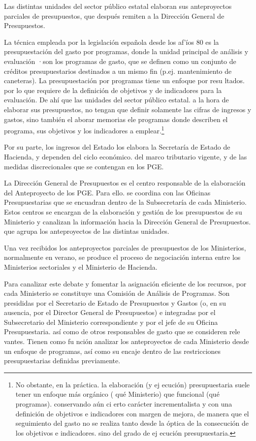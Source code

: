 \documentclass[10pt,a4paper]{article}
\begin{document}
Las distintas unidades del sector público estatal elaboran sus anteproyectos parciales de presupuestos, que después remiten a la Dirección General de Presupuestos.

La técnica empleada por la legislación española desde los af'íos 80 es la presupuestación del gasto por programas, donde la unidad principal de análisis y evaluación ·son los programas de gasto, que se definen como un conjunto de créditos presupuestarios destinados a un mismo fin (p.ej.  mantenimiento de caneteras). La presupuestación por programas tiene un enfoque por resu ltados. por lo que requiere de la definición de objetivos y de indicadores para la evaluación. De ahí que las unidades del sector público estatal. a la hora de elaborar sus presupuestos, no tengan que definir solamente las cifras de ingresos y gastos, sino también el aborar memorias ele programas donde describen el programa, sus objetivos y los indicadores a emplear.\footnote{%
    No obstante, en la práctica. la elaboración (y ej ecución) presupuestaria suele tener un enfoque más orgánico ( qué Ministerio) que funcional (qué programas). conservando aún ci erto carácter incrementalista y con una definición de objetivos e indicadores con margen de mejora, de manera que el seguimiento del gasto no se realiza tanto desde la óptica de la consecución de los objetivos e indicadores. sino del grado de ej ecución presupuestaria.
}

Por su parte, los ingresos del Estado los elabora la Secretaría de Estado de Hacienda, y dependen del ciclo económico. del marco tributario vigente, y de las medidas discrecionales que se contengan en los PGE.

La Dirección General de Presupuestos es el centro responsable de la elaboración del Anteproyecto de los PGE. Para ello. se coordina con las Oficinas Presupuestarias que se encuadran dentro de la Subsecretaría de cada Ministerio. Estos centros se encargan de la elaboración y gestión de los presupuestos de su Ministerio y canalizan la información hacia la Dirección General de Presupuestos. que agrupa los anteproyectos de las distintas unidades.

Una vez recibidos los anteproyectos parciales de presupuestos de los Ministerios, normalmente en verano, se produce el proceso de negociación interna entre los Ministerios sectoriales y el Ministerio de Hacienda.

Para canalizar este debate y fomentar la asignación eficiente de los recursos, por cada Ministerio se constituye una Comisión de Análisis de Programas. Son presididas por el Secretario de Estado de Presupuestos y Gastos (o, en su ausencia, por el Director General de Presupuestos) e integradas por el Subsecretario del Ministerio correspondiente y por el jefe de su Oficina Presupuestaria. así como de otros responsables de gasto que se consideren rele vantes. Tienen como fu nción analizar los anteproyectos de cada Ministerio desde un enfoque de programas, así como su encaje dentro de las restricciones presupuestarias definidas previamente.
\end{document}
